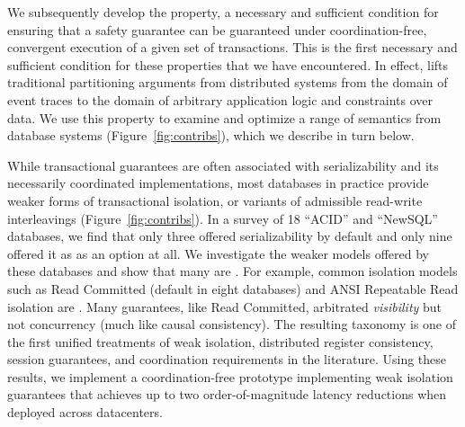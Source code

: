  We subsequently develop the \iconfluence property, a necessary and
 sufficient condition for ensuring that a safety guarantee can be
 guaranteed under coordination-free, convergent execution of a given
 set of transactions. This is the first necessary and sufficient
 condition for these properties that we have encountered. In effect,
 \iconfluence lifts traditional partitioning arguments from
 distributed systems from the domain of event traces to the domain of
 arbitrary application logic and constraints over data. We use this
 property to examine and optimize a range of semantics from database
 systems (Figure~\ref{fig:contribs}), which we describe in turn below.

  While
 transactional guarantees are often associated with serializability
 and its necessarily coordinated implementations, most databases in
 practice provide weaker forms of transactional isolation, or variants
 of admissible read-write interleavings (Figure~\ref{fig:contribs}).
 In a survey of 18 ``ACID'' and ``NewSQL'' databases, we find that
 only three offered serializability by default and only nine offered
 it as as an option at all. We investigate the weaker models offered
 by these databases and show that many are \iconfluent. For example,
 common isolation models such as Read Committed (default in eight
 databases) and ANSI Repeatable Read isolation are \iconfluent. Many
 guarantees, like Read Committed, arbitrated \textit{visibility} but
 not concurrency (much like causal consistency). The resulting
 taxonomy is one of the first unified treatments of weak isolation,
 distributed register consistency, session guarantees, and
 coordination requirements in the literature. Using these results, we
 implement a coordination-free prototype implementing weak isolation
 guarantees that achieves up to two order-of-magnitude latency
 reductions when deployed across datacenters.

